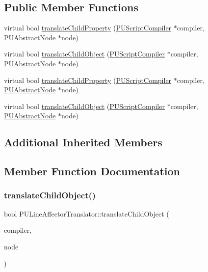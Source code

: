 \subsection*{Public Member Functions}
\begin{DoxyCompactItemize}
\item 
virtual bool \hyperlink{classPULineAffectorTranslator_a461d66e9164503f043fd5310f679b7a2}{translate\+Child\+Property} (\hyperlink{classPUScriptCompiler}{P\+U\+Script\+Compiler} $\ast$compiler, \hyperlink{classPUAbstractNode}{P\+U\+Abstract\+Node} $\ast$node)
\item 
virtual bool \hyperlink{classPULineAffectorTranslator_ac593d6760cdf35388b5e23b48575e74e}{translate\+Child\+Object} (\hyperlink{classPUScriptCompiler}{P\+U\+Script\+Compiler} $\ast$compiler, \hyperlink{classPUAbstractNode}{P\+U\+Abstract\+Node} $\ast$node)
\item 
virtual bool \hyperlink{classPULineAffectorTranslator_a319bd33109dfb7ea8dc20cee66717644}{translate\+Child\+Property} (\hyperlink{classPUScriptCompiler}{P\+U\+Script\+Compiler} $\ast$compiler, \hyperlink{classPUAbstractNode}{P\+U\+Abstract\+Node} $\ast$node)
\item 
virtual bool \hyperlink{classPULineAffectorTranslator_a4b09d712656e78f489c65bda5e474448}{translate\+Child\+Object} (\hyperlink{classPUScriptCompiler}{P\+U\+Script\+Compiler} $\ast$compiler, \hyperlink{classPUAbstractNode}{P\+U\+Abstract\+Node} $\ast$node)
\end{DoxyCompactItemize}
\subsection*{Additional Inherited Members}


\subsection{Member Function Documentation}
\mbox{\label{classPULineAffectorTranslator_ac593d6760cdf35388b5e23b48575e74e}} 
\subsubsection{\texorpdfstring{translate\+Child\+Object()}{translateChildObject()}\hspace{0.1cm}{\footnotesize\ttfamily [1/2]}}
{\footnotesize\ttfamily bool P\+U\+Line\+Affector\+Translator\+::translate\+Child\+Object (\begin{DoxyParamCaption}\item[{\hyperlink{classPUScriptCompiler}{P\+U\+Script\+Compiler} $\ast$}]{compiler,  }\item[{\hyperlink{classPUAbstractNode}{P\+U\+Abstract\+Node} $\ast$}]{node }\end{DoxyParamCaption})\hspace{0.3cm}{\ttfamily [virtual]}}

